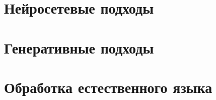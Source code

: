 \label{machine_learning}
\section{Нейросетевые подходы}



\section{Генеративные подходы}



\section{Обработка естественного языка}




